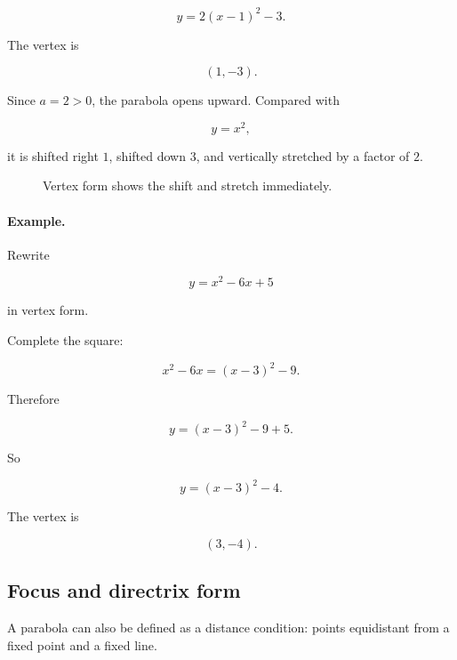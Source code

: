 \[
y=2(x-1)^2-3.
\]

The vertex is

\[
(1,-3).
\]

Since \(a=2>0\), the parabola opens upward.  Compared with

\[
y=x^2,
\]

it is shifted right \(1\), shifted down \(3\), and vertically stretched by a factor of \(2\).

\begin{figure}[h]
\centering
{}
\caption{Vertex form shows the shift and stretch immediately.}
\label{fig:appendix-parabola-vertex-form}
\end{figure}

\paragraph{Example.}
Rewrite

\[
y=x^2-6x+5
\]

in vertex form.

Complete the square:

\[
x^2-6x=(x-3)^2-9.
\]

Therefore

\[
y=(x-3)^2-9+5.
\]

So

\[
\boxed{
y=(x-3)^2-4.
}
\]

The vertex is

\[
\boxed{(3,-4)}.
\]

\subsection{Focus and directrix form}
\label{appsubsec:focus-directrix-parabola}

A parabola can also be defined as a distance condition: points equidistant from a
fixed point and a fixed line.

